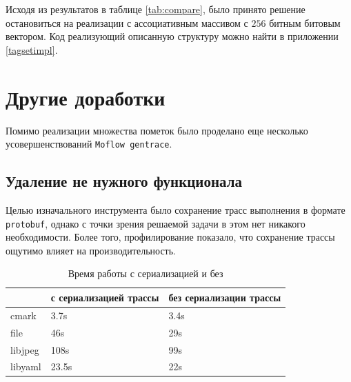 \begin{table}[H]
    \caption{Время работы в секундах для различных реализаций} \label{tab:compare}
\end{table}

Исходя из результатов в таблице \ref{tab:compare}, было принято решение остановиться на реализации с ассоциативным массивом с $256$ битным битовым вектором. Код реализующий описанную структуру можно найти в приложении \ref{tagsetimpl}.

\section{Другие доработки}

Помимо реализации множества пометок было проделано еще несколько усовершенствований \texttt{Moflow gentrace}.

\subsection{Удаление не нужного функционала}

Целью изначального инструмента было сохранение трасс выполнения в формате \texttt{protobuf}, однако с точки зрения решаемой задачи в этом нет никакого необходимости. Более того, профилирование показало, что сохранение трассы ощутимо влияет на производительность.


\begin{table}[H]
    \centering
    \caption{Время работы с сериализацией и без} \label{tab:compare2}
    \begin{tabular}[]{@{}lll@{}}
    \toprule
    & с сериализацией трассы & без сериализации трассы  \tabularnewline
    \midrule
    cmark & 3.7s & 3.4s \tabularnewline
    file & 46s & 29s \tabularnewline
    libjpeg & 108s & 99s \tabularnewline
    libyaml & 23.5s & 22s \tabularnewline
    \bottomrule
\end{tabular}
\end{table}

